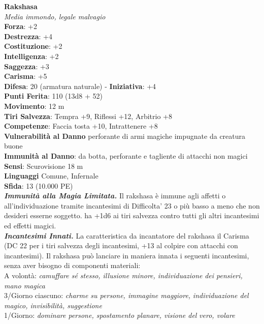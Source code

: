 \begin{multicols}{2}
\medskip\textbf{Rakshasa}\\
\emph{Media immondo, legale malvagio}\\
\textbf{Forza}: +2\\
\textbf{Destrezza}: +4\\
\textbf{Costituzione}: +2\\
\textbf{Intelligenza}: +2\\
\textbf{Saggezza}: +3\\
\textbf{Carisma}: +5\\
\textbf{Difesa}: 20 (armatura naturale) - \textbf{Iniziativa}: +4\\
\textbf{Punti Ferita}: 110 (13d8 + 52)\\
\textbf{Movimento}: 12 m\\
\textbf{Tiri Salvezza}: Tempra +9, Riflessi +12, Arbitrio +8 \\
\textbf{Competenze}: Faccia tosta +10, Intrattenere +8\\
\textbf{Vulnerabilità al Danno} perforante di armi magiche impugnate da creatura buone\\
\textbf{Immunità al Danno}: da botta, perforante e tagliente di attacchi non magici\\
\textbf{Sensi}: Scurovisione 18 m\\
\textbf{Linguaggi} Comune, Infernale\\
\textbf{Sfida}: 13 (10.000 PE)\smallskip\\
\emph{\textbf{Immunità alla Magia Limitata.}} Il rakshasa è immune agli affetti o all'individuazione tramite incantesimi di Difficolta' 23 o più basso a meno che non desideri esserne soggetto. ha +1d6 ai tiri salvezza contro tutti gli altri incantesimi ed effetti magici.\\
\emph{\textbf{Incantesimi Innati.}} La caratteristica da incantatore del rakshasa il Carisma (DC  22 per i tiri salvezza degli incantesimi, +13 al colpire  con attacchi con incantesimi). Il rakshasa può lanciare in maniera  innata i seguenti incantesimi, senza aver bisogno di componenti  materiali:\\
A volontà: \emph{camuffare sé stesso, illusione minore, individuazione} \emph{dei pensieri, mano magica}\\
3/Giorno ciascuno: \emph{charme su persone, immagine maggiore,} \emph{individuazione del magico, invisibilità, suggestione}\\
1/Giorno: \emph{dominare persone, spostamento planare, visione del} \emph{vero, volare}\\

\end{multicols}
